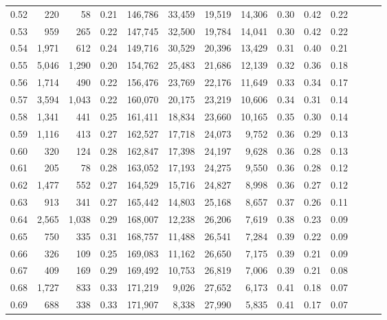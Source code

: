 \begin{tabular}{rrrrrrrrrrrrrr}
0.52 &     220 &     58 &  0.21 &  146,786 &   33,459 &  19,519 &  14,306 &  0.30 &  0.42 &      0.22 \\
0.53 &     959 &    265 &  0.22 &  147,745 &   32,500 &  19,784 &  14,041 &  0.30 &  0.42 &      0.22 \\
0.54 &   1,971 &    612 &  0.24 &  149,716 &   30,529 &  20,396 &  13,429 &  0.31 &  0.40 &      0.21 \\
0.55 &   5,046 &  1,290 &  0.20 &  154,762 &   25,483 &  21,686 &  12,139 &  0.32 &  0.36 &      0.18 \\
0.56 &   1,714 &    490 &  0.22 &  156,476 &   23,769 &  22,176 &  11,649 &  0.33 &  0.34 &      0.17 \\
0.57 &   3,594 &  1,043 &  0.22 &  160,070 &   20,175 &  23,219 &  10,606 &  0.34 &  0.31 &      0.14 \\
0.58 &   1,341 &    441 &  0.25 &  161,411 &   18,834 &  23,660 &  10,165 &  0.35 &  0.30 &      0.14 \\
0.59 &   1,116 &    413 &  0.27 &  162,527 &   17,718 &  24,073 &   9,752 &  0.36 &  0.29 &      0.13 \\
0.60 &     320 &    124 &  0.28 &  162,847 &   17,398 &  24,197 &   9,628 &  0.36 &  0.28 &      0.13 \\
0.61 &     205 &     78 &  0.28 &  163,052 &   17,193 &  24,275 &   9,550 &  0.36 &  0.28 &      0.12 \\
0.62 &   1,477 &    552 &  0.27 &  164,529 &   15,716 &  24,827 &   8,998 &  0.36 &  0.27 &      0.12 \\
0.63 &     913 &    341 &  0.27 &  165,442 &   14,803 &  25,168 &   8,657 &  0.37 &  0.26 &      0.11 \\
0.64 &   2,565 &  1,038 &  0.29 &  168,007 &   12,238 &  26,206 &   7,619 &  0.38 &  0.23 &      0.09 \\
0.65 &     750 &    335 &  0.31 &  168,757 &   11,488 &  26,541 &   7,284 &  0.39 &  0.22 &      0.09 \\
0.66 &     326 &    109 &  0.25 &  169,083 &   11,162 &  26,650 &   7,175 &  0.39 &  0.21 &      0.09 \\
0.67 &     409 &    169 &  0.29 &  169,492 &   10,753 &  26,819 &   7,006 &  0.39 &  0.21 &      0.08 \\
0.68 &   1,727 &    833 &  0.33 &  171,219 &    9,026 &  27,652 &   6,173 &  0.41 &  0.18 &      0.07 \\
0.69 &     688 &    338 &  0.33 &  171,907 &    8,338 &  27,990 &   5,835 &  0.41 &  0.17 &      0.07 \\

\end{tabular}
